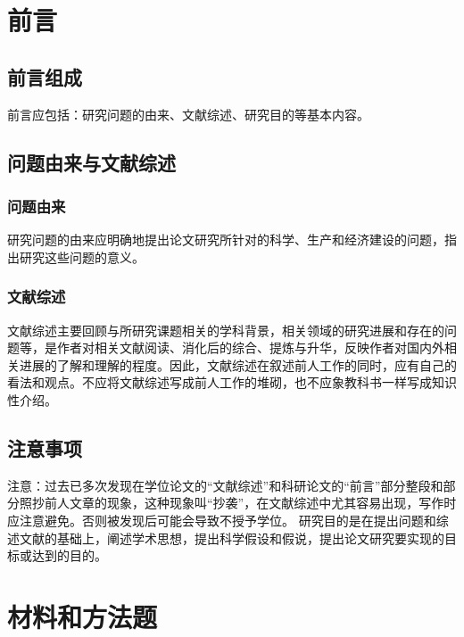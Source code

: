 \documentclass[a4paper]{article}
\newcommand{\song}{\CJKfamily{song}}
\newcommand{\kai}{\CJKfamily{kai}}
\newcommand{\xiaosihao}{\fontsize{12pt}{18pt}\selectfont}
\newcommand{\wuhao}{\fontsize{10.5pt}{18pt}\selectfont}
\newcommand{\sectionbreak}{\clearpage} %
\newcommand\seccontent{
	\song
	\xiaosihao %
    \setlength{\parindent}{2em} %
    \setlength{\parskip}{0pt}
    }
\theoremstyle{definition}
\theoremstyle{plain}
\theoremstyle{remark}
\newcommand{\hongzifuzhu}[1]{\textcolor{red}{\kai \wuhao(#1)}}
\begin{document}
\seccontent
\section{前言}

\subsection{前言组成}
前言应包括：研究问题的由来、文献综述、研究目的等基本内容。


\subsection{问题由来与文献综述}


\subsubsection{问题由来}
研究问题的由来应明确地提出论文研究所针对的科学、生产和经济建设的问题，指出研究这些问题的意义。


\subsubsection{文献综述}
文献综述主要回顾与所研究课题相关的学科背景，相关领域的研究进展和存在的问题等，是作者对相关文献阅读、消化后的综合、提炼与升华，反映作者对国内外相关进展的了解和理解的程度。因此，文献综述在叙述前人工作的同时，应有自己的看法和观点。不应将文献综述写成前人工作的堆砌，也不应象教科书一样写成知识性介绍。


\subsection{注意事项}
注意：过去已多次发现在学位论文的“文献综述”和科研论文的“前言”部分整段和部分照抄前人文章的现象，这种现象叫“抄袭”，在文献综述中尤其容易出现，写作时应注意避免。否则被发现后可能会导致不授予学位。
研究目的是在提出问题和综述文献的基础上，阐述学术思想，提出科学假设和假说，提出论文研究要实现的目标或达到的目的。

\sectionbreak

\section{材料和方法题}
\end{document}
